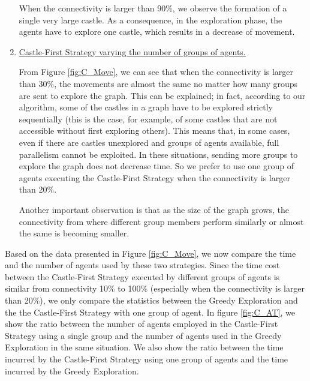 \begin{enumerate}
When the connectivity is larger than 90\%,  we observe the formation of a single very large castle.
As a consequence,  in the exploration phase, the agents have to explore one castle, which results in a decrease of movement.  


\item \underline{  {\sc Castle-First} Strategy varying the number of  groups of agents.}

From   Figure \ref{fig:C_Move}, we can see that when the connectivity is larger than 30\%, the movements are almost the same no matter how many groups are sent to explore the graph. This can be explained; in fact,
  according to our algorithm, some of the castles in a graph have to be explored strictly sequentially (this is the case, for example, of some castles that are not accessible without first exploring others). 
This means that,  in some cases, even if there are castles unexplored and groups of agents available, full parallelism cannot be exploited.  In these situations,  sending more groups to explore the graph does not decrease time. So we prefer to use one group of agents executing the {\sc Castle-First} Strategy when the connectivity is larger than 20\%.

Another important observation is that as the size of the graph grows, the connectivity from where different group members perform similarly or almost the same is becoming smaller.


\end{enumerate} 

Based on the data presented in Figure \ref{fig:C_Move}, we now compare the time and the number of agents used by these two strategies. Since the time cost between the {\sc Castle-First} Strategy executed by different groups of agents is similar from connectivity 10\% to 100\% (especially when the connectivity is larger than 20\%),  we only compare the statistics between the {\sc Greedy} Exploration and the the {\sc Castle-First} Strategy with one group of agent. 
In figure \ref{fig:C_AT}, we show the ratio between the number of agents employed in the {\sc Castle-First} Strategy using a single group and the number of agents used in the {\sc Greedy} Exploration in the same situation.
We also show the ratio between the time incurred by the {\sc Castle-First} Strategy using one group of agents and the time incurred by the {\sc Greedy} Exploration.

